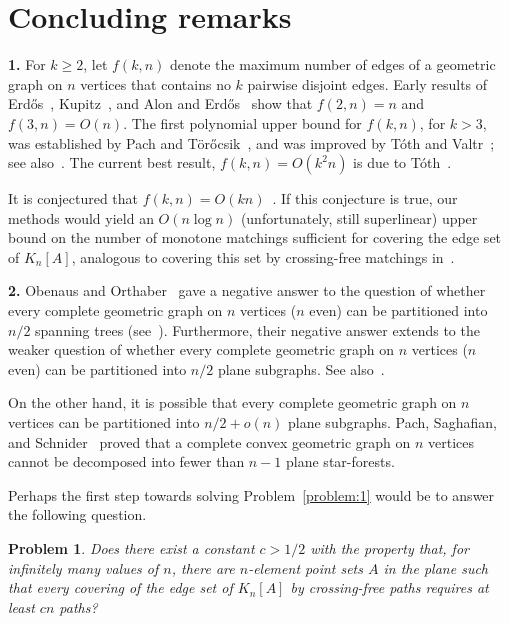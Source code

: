 \documentclass[a4paper,USenglish]{lipics-v2021}
\newtheorem{problem}[theorem]{Problem}
\begin{document}
\section{Concluding remarks} \label{sec:remarks}

\noindent\textbf{1. } For $k \geq 2$, let $f(k,n)$ denote the maximum number of
edges of a geometric graph on $n$ vertices 
that contains no $k$ pairwise disjoint edges. Early results of
Erd\H{o}s~\cite{Erd46}, Kupitz~\cite{Ku79}, and Alon and Erd\H{o}s~\cite{AE89} 
show that $f(2, n) = n$ and $f(3,n)=O(n)$. 
The first polynomial upper bound for $f(k,n)$, for $k>3$, was established by
Pach and T{\"{o}}r{\H{o}}csik~\cite{PT94}, and was improved by T{\'{o}}th and Valtr~\cite{TV98};
see also~\cite[Chap.~14]{PA95}. 
The current best result, $f(k,n)= O(k^2 n)$ is due to T{\'{o}}th~\cite{To00}. 

It is conjectured that $f(k,n)= O(k n)$~\cite[Chap.~9.5]{BMP05}. If this
conjecture is true, our methods would yield an 
$O(n \log{n})$ (unfortunately, still superlinear) upper bound on the number of
monotone matchings sufficient for covering the edge set of $K_n[A]$,  
analogous to covering this set by crossing-free matchings in~\cite{ADH+05}. 
\smallskip

\noindent\textbf{2. } Obenaus and Orthaber~\cite{OO21} gave a negative answer to
the question of whether every complete 
geometric graph on $n$ vertices ($n$ even) can be partitioned into $n/2$ spanning trees (see~\cite{BHRW06}).
Furthermore, their negative answer extends to the weaker question of whether every complete geometric graph
on $n$ vertices ($n$ even) can be partitioned into $n/2$ plane subgraphs.
See also~\cite{AOO+22}.

On the other hand, it is possible that every complete geometric graph on $n$ vertices 
can be partitioned into $n/2+o(n)$  plane subgraphs. Pach, Saghafian, and Schnider~\cite{PSS23}
proved that a complete convex geometric graph on $n$ vertices cannot be decomposed into fewer than
$n-1$ plane star-forests.

Perhaps the first step towards solving Problem~\ref{problem:1} would be to answer the following question.

\begin{problem} Does there exist a constant $c>1/2$ with the property
  that, for infinitely many values of $n$, there are 
  $n$-element point sets $A$ in the plane such that every covering of the edge set
  of $K_n[A]$ by crossing-free paths requires at least $cn$ paths?  
\end{problem}
\end{document}
